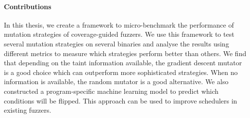 \paragraph{Contributions}
In this thesis, we create a framework to micro-benchmark the performance of mutation strategies of coverage-guided fuzzers. We use this framework to test several mutation strategies on several binaries and analyse the results using different metrics to measure which strategies perform better than others.
We find that depending on the taint information available, the gradient descent mutator is a good choice which can outperform more sophisticated strategies. When no information is available, the random mutator is a good alternative.
We also constructed a program-specific machine learning model to predict which conditions will be flipped. This approach can be used to improve schedulers in existing fuzzers.



\begin{comment}
We will adjust angora to output the trace and the input and expected output at a branch.
We will then rerun the trace while we fuzz the input and see if we can flip the branch using different fuzzing stategies.
We will do this by converting the program to LLVM, then with clang we instrument the program using the AST representation at the comparison instructions to see if we still follow the same trace based on the generated input.

Possible stategies:
concolic execution (KLEE?)
magic byte extraction
input-state correspondence
random guessing
mutational fuzzing
evolutional fuzzing
gradient descend

possible when time:
symbolic execution (KLEE)
use neural nets (NEUEX and NEUZZ)

These are microbenchmarks. We do not look at how strategies help finding interesting branches.
Completely context aware branch based strategy from angora

Fuzzers are a bag of tricks, try to evaluate part of the tricks, maybe even create fuzzer which adopts strategy based on `function shape'

How to determine function shape?


Step 1:
Modify Angora to get (trace, input, output)
Step 2:
Write instrumentation tool to run program with input and check trace
Step 3:
Write strategies
Step 4:
Compare strategies
Step 5:
Determine function shape
Step 6:
Rate strategies based on function shape
Step 7:
Create fuzzer based on function shape/strategy
 
\end{comment}
